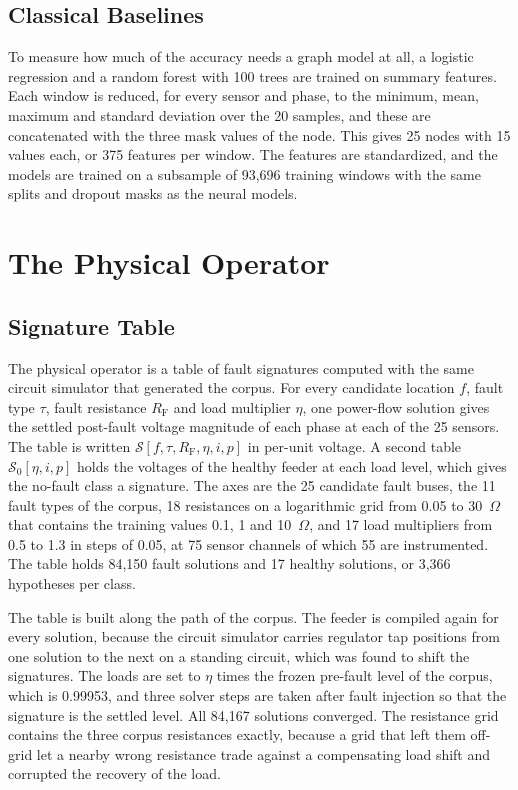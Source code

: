 \documentclass[MTech]{ugthesis}
\begin{document}
\subsection{Classical Baselines}

To measure how much of the accuracy needs a graph model at all, a logistic regression and a random forest with 100 trees are trained on summary features. Each window is reduced, for every sensor and phase, to the minimum, mean, maximum and standard deviation over the 20 samples, and these are concatenated with the three mask values of the node. This gives 25 nodes with 15 values each, or 375 features per window. The features are standardized, and the models are trained on a subsample of 93,696 training windows with the same splits and dropout masks as the neural models.

\section{The Physical Operator}
\label{sec:physics}

\subsection{Signature Table}

The physical operator is a table of fault signatures computed with the same circuit simulator that generated the corpus. For every candidate location $f$, fault type $\tau$, fault resistance $R_{\mathrm{F}}$ and load multiplier $\eta$, one power-flow solution gives the settled post-fault voltage magnitude of each phase at each of the 25 sensors. The table is written $\mathcal{S}[f,\tau,R_{\mathrm{F}},\eta,i,p]$ in per-unit voltage. A second table $\mathcal{S}_0[\eta,i,p]$ holds the voltages of the healthy feeder at each load level, which gives the no-fault class a signature. The axes are the 25 candidate fault buses, the 11 fault types of the corpus, 18 resistances on a logarithmic grid from 0.05 to 30~$\Omega$ that contains the training values 0.1, 1 and 10~$\Omega$, and 17 load multipliers from 0.5 to 1.3 in steps of 0.05, at 75 sensor channels of which 55 are instrumented. The table holds 84,150 fault solutions and 17 healthy solutions, or 3,366 hypotheses per class.


The table is built along the path of the corpus. The feeder is compiled again for every solution, because the circuit simulator carries regulator tap positions from one solution to the next on a standing circuit, which was found to shift the signatures. The loads are set to $\eta$ times the frozen pre-fault level of the corpus, which is 0.99953, and three solver steps are taken after fault injection so that the signature is the settled level. All 84,167 solutions converged. The resistance grid contains the three corpus resistances exactly, because a grid that left them off-grid let a nearby wrong resistance trade against a compensating load shift and corrupted the recovery of the load.
\end{document}
